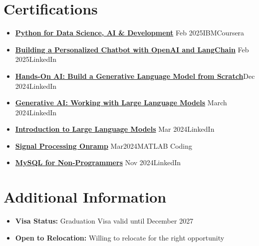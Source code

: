 \documentclass[10 pt, letterpaper]{article}
\begin{document}
\section*{Certifications}
\begin{itemize}
    \item\textbf{\href{https://coursera.org/share/3c982fd6e2daecbe9351ff039d7acda9}{Python for Data Science, AI \& Development}} \hfill {Feb 2025}\textbar IBM\textbar{}Coursera
    \vspace{-0.23cm}
    \item\textbf{\href{https://www.linkedin.com/learning/certificates/d7375d8dd9a47b3b91cd6c67d92fc23df7e8e1ca76574090603c566d80285f07?u=69719634}{
Building a Personalized Chatbot with OpenAI and LangChain}} \hfill Feb 2025\textbar LinkedIn 
       \vspace{-0.23cm}
 
    \item\textbf{\href{https://www.linkedin.com/learning/certificates/dba3eeed136b3c9d110aa04dcddc424b2acce45023f6317ceb1664018417fec0?u=69719634}{Hands-On AI: Build a Generative Language Model from Scratch}}\hfill Dec 2024\textbar LinkedIn
    \vspace{-0.25cm}
    \item \textbf{\href{https://www.linkedin.com/learning/certificates/922edd76012f6c96c8cc9895ab88d9f348b60843ac59d3f74562bcef4e064862?u=69719634}{Generative AI: Working with Large Language Models}} \hfill March 2024\textbar LinkedIn
    \vspace{-0.25cm}
    \item \textbf{\href{https://www.linkedin.com/learning/certificates/6e6de6f7cd742f6c87451ea0a2835a0e46a86eeb0449e242d459604bfc531359?u=69719634}{Introduction to Large Language Models}} \hfill Mar 2024\textbar LinkedIn
       \vspace{-0.25cm}
    \item \textbf{\href{https://matlabacademy.mathworks.com/progress/share/certificate.html?id=03cb5d04-7470-437e-84ed-50cc90b0257e&}{Signal Processing Onramp}} \hfill Mar2024\textbar MATLAB Coding
       \vspace{-0.25cm}
    \item\textbf{\href{https://www.linkedin.com/learning/certificates/d760710a391cb359911e9966bfc9926d6b82fe2d5e24348c40749d3cc696644b?u=69719634}{MySQL for Non-Programmers}} \hfill Nov 2024\textbar LinkedIn
\end{itemize}


\section{Additional Information}
\begin{itemize}
    \item \textbf{Visa Status:} {Graduation Visa valid until December 2027}
    \item \textbf{Open to Relocation:} Willing to relocate for the right opportunity
\end{itemize}
\end{document}
